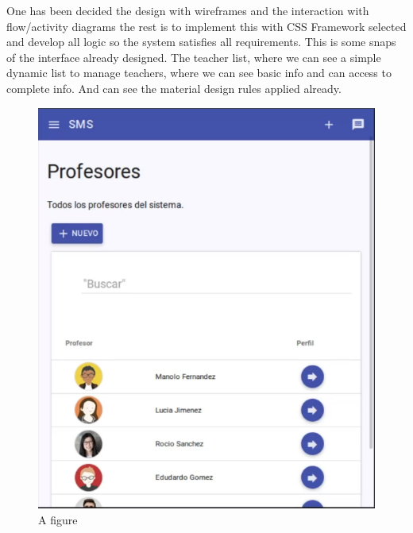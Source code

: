 \noindent One has been decided the design with wireframes and the interaction
with flow/activity diagrams the rest is to implement this with CSS Framework
selected and develop all logic so the system satisfies all requirements.
This is some snaps of the interface already designed.
\intro
The teacher list, where we can see a simple dynamic list to manage teachers,
where we can see basic info and can access to complete info. And can see the
material design rules applied already.

\begin{figure}[H]
\centering
\begin{minipage}{.5\textwidth}
  \centering
  \includegraphics[scale=0.3]{img/snaps/teachers_list.png}
  \caption{A figure}
\end{minipage}%
\begin{minipage}{.5\textwidth}
  \centering

\end{minipage}
\end{figure}
